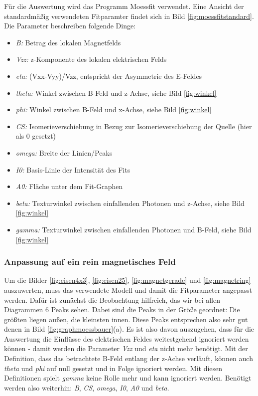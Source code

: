 \documentclass[german, %
parskip=full, %
bibliography=totoc, %
]{scrartcl}
\begin{document}
Für die Auswertung wird das Programm Moessfit verwendet. Eine Ansicht der standardmäßig verwendeten Fitparamter findet sich in Bild \ref{fig:moessfitstandard}. Die Parameter beschreiben folgende Dinge:
\begin{itemize}
\item \textit{B:} Betrag des lokalen Magnetfelds
\item \textit{Vzz:} z-Komponente des lokalen elektrischen Felds
\item \textit{eta:} (Vxx-Vyy)/Vzz, entspricht der Asymmetrie des E-Feldes
\item \textit{theta:} Winkel zwischen B-Feld und z-Achse, siehe Bild \ref{fig:winkel}
\item \textit{phi:} Winkel zwischen B-Feld und x-Achse, siehe Bild \ref{fig:winkel}
\item \textit{CS:} Isomerieverschiebung in Bezug zur Isomerieverschiebung der Quelle (hier als 0 gesetzt)
\item \textit{omega:} Breite der Linien/Peaks
\item \textit{I0:} Basis-Linie der Intensität des Fits
\item \textit{A0:} Fläche unter dem Fit-Graphen
\item \textit{beta:} Texturwinkel zwischen einfallenden Photonen und z-Achse, siehe Bild \ref{fig:winkel}
\item \textit{gamma:} Texturwinkel zwischen einfallenden Photonen und B-Feld, siehe Bild \ref{fig:winkel}
\end{itemize}

\subsubsection{Anpassung auf ein rein magnetisches Feld}

Um die Bilder \ref{fig:eisen4x3}, \ref{fig:eisen25}, \ref{fig:magnetgerade} und \ref{fig:magnetring} auszuwerten, muss das verwendete Modell und damit die Fitparameter angepasst werden. Dafür ist zunächst die Beobachtung hilfreich, das wir bei allen Diagrammen 6 Peaks sehen. Dabei sind die Peaks in der Größe geordnet: Die größten liegen außen, die kleinsten innen. Diese Peaks entsprechen also sehr gut denen in Bild \ref{fig:graphmoessbauer}(a). Es ist also davon auszugehen, dass für die Auswertung die Einflüsse des elektrischen Feldes weitestgehend ignoriert werden können - damit werden die Parameter \textit{Vzz} und \textit{eta} nicht mehr benötigt. Mit der Definition, dass das betrachtete B-Feld entlang der z-Achse verläuft, können auch \textit{theta} und \textit{phi} auf null gesetzt und in Folge ignoriert werden. Mit diesen Definitionen spielt \textit{gamma} keine Rolle mehr und kann ignoriert werden. Benötigt werden also weiterhin: \textit{B}, \textit{CS}, \textit{omega}, \textit{I0}, \textit{A0} und \textit{beta}. 
\end{document}
